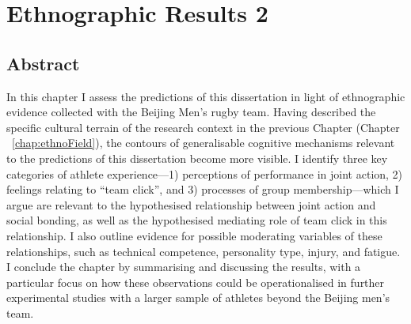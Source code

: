 \chapter{\label{chap:ethnoResults}Ethnographic Results 2}

\minitoc



\section{Abstract}
In this chapter I assess the predictions of this dissertation in light of ethnographic evidence collected with the Beijing Men's rugby team.  Having described the specific cultural terrain of the research context in the previous Chapter (Chapter ~\ref{chap:ethnoField}), the contours of generalisable cognitive mechanisms relevant to the predictions of this dissertation become more visible. I identify three key categories of athlete experience---1) perceptions of performance in joint action, 2) feelings relating to ``team click'', and 3) processes of group membership---which I argue are relevant to the hypothesised relationship between joint action and social bonding, as well as the hypothesised mediating role of team click in this relationship. I also outline evidence for possible moderating variables of these relationships, such as technical competence, personality type, injury, and fatigue. I conclude the chapter by summarising and discussing the results, with a particular focus on how these observations could be operationalised in further experimental studies with a larger sample of athletes beyond the Beijing men's team.





